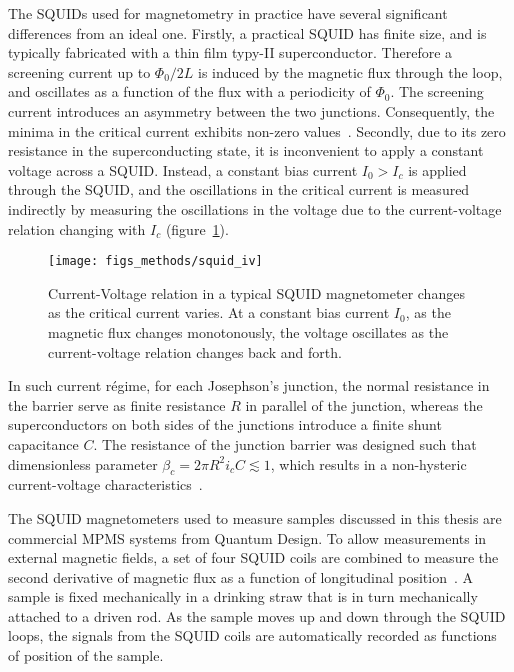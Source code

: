 The SQUIDs used for magnetometry in practice have several significant differences from an ideal one. Firstly, a practical SQUID has finite size, and is typically fabricated with a thin film typy-II superconductor. Therefore a screening current up to $\Phi_0 / 2L$ is induced by the magnetic flux through the loop, and oscillates as a function of the flux with a periodicity of $\Phi_0$. The screening current introduces an asymmetry between the two junctions. Consequently, the minima in the critical current exhibits non-zero values~\cite{Clarke1976}. Secondly, due to its zero resistance in the superconducting state, it is inconvenient to apply a constant voltage across a SQUID. Instead, a constant bias current $I_0 > I_c$ is applied through the SQUID, and the oscillations in the critical current is measured indirectly by measuring the oscillations in the voltage due to the current-voltage relation changing with $I_c$ (figure~\ref{fig:squid_iv}). %
\begin{figure}[ht]%
	\centering%
    \texttt{[image: figs\_methods/squid\_iv]}%
    \caption[Current-Voltage relation in a typical SQUID magnetometer]{\label{fig:squid_iv}Current-Voltage relation in a typical SQUID magnetometer changes as the critical current varies. At a constant bias current $I_0$, as the magnetic flux changes monotonously, the voltage oscillates as the current-voltage relation changes back and forth.}%
\end{figure}%
In such current r\'egime, for each Josephson's junction, the normal resistance in the barrier serve as finite resistance $R$ in parallel of the junction, whereas the superconductors on both sides of the junctions introduce a finite shunt capacitance $C$. The resistance of the junction barrier was designed such that dimensionless parameter $\beta_c = 2\pi{}R^2i_cC \lesssim 1$, which results in a non-hysteric current-voltage characteristics~\cite{Hansma1971}.

The SQUID magnetometers used to measure samples discussed in this thesis are commercial MPMS systems from Quantum Design. To allow measurements in external magnetic fields, a set of four SQUID coils are combined to measure the second derivative of magnetic flux as a function of longitudinal position~\cite{mpms_hardware}. A sample is fixed mechanically in a drinking straw that is in turn mechanically attached to a driven rod. As the sample moves up and down through the SQUID loops, the signals from the SQUID coils are automatically recorded as functions of position of the sample.

